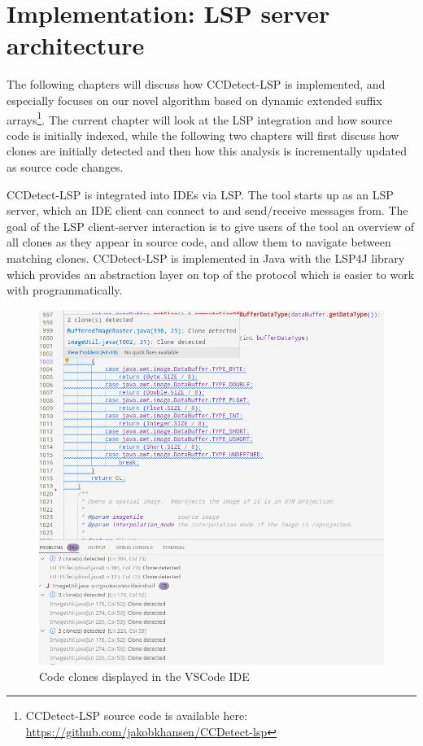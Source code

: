 \chapter{Implementation: LSP server architecture}
\label{lspimplementation}

The following chapters will discuss how CCDetect-LSP is implemented, and especially
focuses on our novel algorithm based on dynamic extended suffix
arrays\footnote{CCDetect-LSP source code is available here:
\url{https://github.com/jakobkhansen/CCDetect-lsp}}. The current chapter will look at the
LSP integration and how source code is initially indexed, while the following two chapters
will first discuss how clones are initially detected and then how this analysis is
incrementally updated as source code changes.

CCDetect-LSP is integrated into IDEs via LSP. The tool starts up as an LSP server, which
an IDE client can connect to and send/receive messages from. The goal of the LSP
client-server interaction is to give users of the tool an overview of all clones as they
appear in source code, and allow them to navigate between matching clones. CCDetect-LSP is
implemented in Java with the LSP4J library which provides an abstraction layer on top of
the protocol which is easier to work with programmatically.

\begin{figure}[ht!]
	\includegraphics[width=\textwidth]{figures/vscodecodeclone.png}
	\caption{Code clones displayed in the VSCode IDE}
	\label{fig:vscodeclones}
\end{figure}

